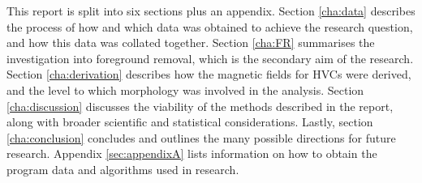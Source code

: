 This report is split into six sections plus an appendix. Section \ref{cha:data} describes the process of how and which data was obtained to achieve the research question, and how this data was collated together. Section \ref{cha:FR} summarises the investigation into foreground removal, which is the secondary aim of the research. Section \ref{cha:derivation} describes how the magnetic fields for HVCs were derived, and the level to which morphology was involved in the analysis. Section \ref{cha:discussion} discusses the viability of the methods described in the report, along with broader scientific and statistical considerations. Lastly, section \ref{cha:conclusion} concludes and outlines the many possible directions for future research. Appendix \ref{sec:appendixA} lists information on how to obtain the program data and algorithms used in research.